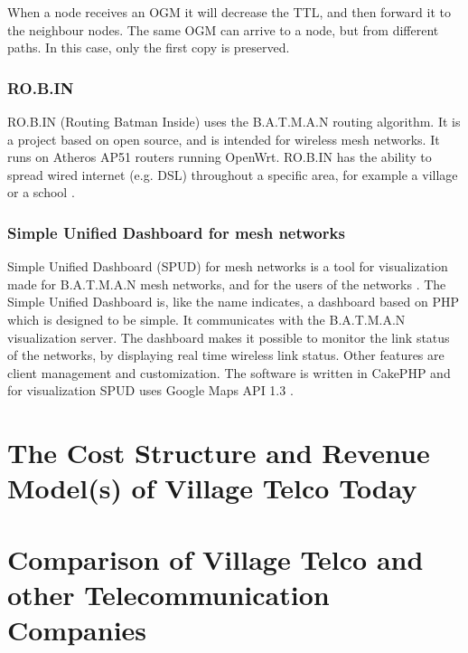 When a node receives an OGM it will decrease the TTL, and then forward it to the neighbour nodes. The same OGM can arrive to a node, but from different paths. In this case, only the first copy is preserved. 

\subsubsection{RO.B.IN}
RO.B.IN (Routing Batman Inside) uses the B.A.T.M.A.N routing algorithm. It is a project based on open source, and is intended for wireless mesh networks. It runs on Atheros AP51 routers running OpenWrt. RO.B.IN has the ability to spread wired internet (e.g. DSL) throughout a specific area, for example a village or a school \cite{robin}. 

\subsubsection{Simple Unified Dashboard for mesh networks}
Simple Unified Dashboard (SPUD) for mesh networks is a tool for visualization made for B.A.T.M.A.N mesh networks, and for the users of the networks \cite{spud}. The Simple Unified Dashboard is, like the name indicates, a dashboard based on PHP which is designed to be simple. It communicates with the B.A.T.M.A.N visualization server. The dashboard makes it possible to monitor the link status of the networks, by displaying real time wireless link status. Other features are client management and customization. The software is written in CakePHP and for visualization SPUD uses Google Maps API 1.3 \cite{spud}.







\section{The Cost Structure and Revenue Model(s) of Village Telco Today}

\section{Comparison of Village Telco and other Telecommunication Companies}
